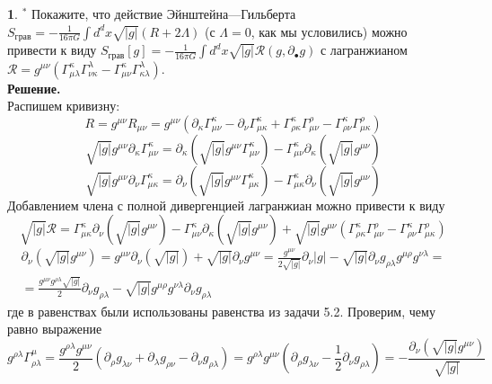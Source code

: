 \documentclass[12pt]{article}
\theoremstyle{definition}
\newtheorem{zad}{}[section]
\begin{document}
\begin{zad}
\textbf{$^*$} Покажите, что действие Эйнштейна—Гильберта $S_{грав}=-\frac{1}{16\pi G}\int d^dx\sqrt{|g|}(R+2\Lambda)$ (с $\Lambda = 0$, как мы условились) можно привести к виду $S_{грав}[g]=-\frac{1}{16\pi G}\int d^dx\sqrt{|g|}\mathcal{R}(g,\partial_\bullet g)$ с лагранжианом $\mathcal{R}=g^{\mu\nu}(\Gamma^\kappa_{\mu\lambda}\Gamma^\lambda_{\nu\kappa}-\Gamma^\kappa_{\mu\nu}\Gamma^\lambda_{\kappa\lambda})$.\\
\textbf{Решение.}\\
Распишем кривизну:
\begin{equation}
    R=g^{\mu\nu}R_{\mu\nu}=g^{\mu\nu}(\partial_\kappa\Gamma^\kappa_{\mu\nu}-\partial_\nu\Gamma^\kappa_{\mu\kappa}+\Gamma^\kappa_{\rho\kappa}\Gamma^\rho_{\mu\nu}-\Gamma^\kappa_{\rho\nu}\Gamma^\rho_{\mu\kappa})
\end{equation}
\begin{equation}
    \sqrt{|g|}g^{\mu\nu}\partial_\kappa\Gamma^\kappa_{\mu\nu}=\partial_\kappa(\sqrt{|g|}g^{\mu\nu}\Gamma^\kappa_{\mu\nu})-\Gamma^\kappa_{\mu\nu}\partial_\kappa(\sqrt{|g|}g^{\mu\nu})
\end{equation}
\begin{equation}
    \sqrt{|g|}g^{\mu\nu}\partial_\nu\Gamma^\kappa_{\mu\kappa}=\partial_\nu(\sqrt{|g|}g^{\mu\nu}\Gamma^\kappa_{\mu\kappa})-\Gamma^\kappa_{\mu\kappa}\partial_\nu(\sqrt{|g|}g^{\mu\nu})
\end{equation}
Добавлением члена с полной дивергенцией лагранжиан можно привести к виду
\begin{equation}
    \sqrt{|g|}\mathcal{R}=\Gamma^\kappa_{\mu\kappa}\partial_\nu(\sqrt{|g|}g^{\mu\nu})-\Gamma^\kappa_{\mu\nu}\partial_\kappa(\sqrt{|g|}g^{\mu\nu})+\sqrt{|g|}g^{\mu\nu}(\Gamma^\kappa_{\rho\kappa}\Gamma^\rho_{\mu\nu}-\Gamma^\kappa_{\rho\nu}\Gamma^\rho_{\mu\kappa})
\end{equation}
\begin{multline}
    \partial_\nu(\sqrt{|g|}g^{\mu\nu})=g^{\mu\nu}\partial_\nu(\sqrt{|g|})+\sqrt{|g|}\partial_\nu g^{\mu\nu}=\frac{g^{\mu\nu}}{2\sqrt{|g|}}\partial_\nu|g|-\sqrt{|g|}\partial_\nu g_{\rho\lambda}g^{\mu\rho}g^{\nu\lambda}=\\=\frac{g^{\mu\nu}g^{\rho\lambda}\sqrt{|g|}}{2}\partial_\nu g_{\rho\lambda}-\sqrt{|g|}g^{\mu\rho}g^{\nu\lambda}\partial_\nu g_{\rho\lambda}
\end{multline}
где в равенствах были использованы равенства из задачи 5.2. Проверим, чему равно выражение
\begin{equation}
    g^{\rho\lambda}\Gamma^\mu_{\rho\lambda}=\frac{g^{\rho\lambda}g^{\mu\nu}}{2}(\partial_\rho g_{\lambda\nu}+\partial_\lambda g_{\rho\nu}-\partial_\nu g_{\rho\lambda})=g^{\rho\lambda}g^{\mu\nu}\left(\partial_\rho g_{\lambda\nu}-\frac{1}{2}\partial_\nu g_{\rho\lambda}\right)=-\frac{\partial_\nu(\sqrt{|g|}g^{\mu\nu})}{\sqrt{|g|}}

\end{equation}
\end{zad}
\end{document}
